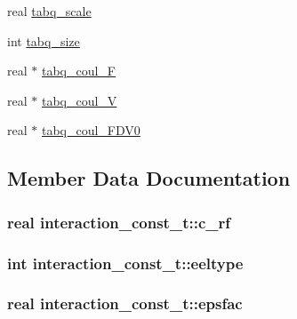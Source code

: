 \begin{DoxyCompactItemize}
real \hyperlink{structinteraction__const__t_acc88b601976579d20bacd241e065e105}{tabq\-\_\-scale}
\item 
int \hyperlink{structinteraction__const__t_abff4ef1127eb2d16922285bd766dda74}{tabq\-\_\-size}
\item 
real $\ast$ \hyperlink{structinteraction__const__t_a18d30b417d54f07f933e9f6858f448e4}{tabq\-\_\-coul\-\_\-\-F}
\item 
real $\ast$ \hyperlink{structinteraction__const__t_a4a80b3877de038a91c95daf71d99e565}{tabq\-\_\-coul\-\_\-\-V}
\item 
real $\ast$ \hyperlink{structinteraction__const__t_a1def6ec9c6e0e58aa81db0f5fcb4dc32}{tabq\-\_\-coul\-\_\-\-F\-D\-V0}
\end{DoxyCompactItemize}


\subsection{\-Member \-Data \-Documentation}
\hypertarget{structinteraction__const__t_a3992f3695c023a92de54dea9b5a70118}{
\subsubsection[{c\-\_\-rf}]{\setlength{\rightskip}{0pt plus 5cm}real {\bf interaction\-\_\-const\-\_\-t\-::c\-\_\-rf}}}\label{structinteraction__const__t_a3992f3695c023a92de54dea9b5a70118}
\hypertarget{structinteraction__const__t_ad5b2cdabd004cc9b1c23f23456049633}{
\subsubsection[{eeltype}]{\setlength{\rightskip}{0pt plus 5cm}int {\bf interaction\-\_\-const\-\_\-t\-::eeltype}}}\label{structinteraction__const__t_ad5b2cdabd004cc9b1c23f23456049633}
\hypertarget{structinteraction__const__t_a17027bcec280cb44a96fad4a09968464}{
\subsubsection[{epsfac}]{\setlength{\rightskip}{0pt plus 5cm}real {\bf interaction\-\_\-const\-\_\-t\-::epsfac}}}\label{structinteraction__const__t_a17027bcec280cb44a96fad4a09968464}
